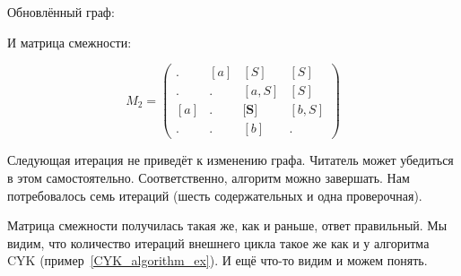 \begin{example}
Обновлённый граф:
\begin{center}
\end{center}
  

И матрица смежности:

$$ M_2 =
\begin{pmatrix} 
. & [a] & [S] & [S] \\
. & . & [a, S] & [S] \\
[a] & . & \textbf{[S]} & [b,S] \\
. & . & [b] & . 
\end{pmatrix}
$$


Следующая итерация не приведёт к изменению графа.
Читатель может убедиться в этом самостоятельно.
Соответственно, алгоритм можно завершать.
Нам потребовалось семь итераций (шесть содержательных и одна проверочная).

Матрица смежности получилась такая же, как и раньше, ответ правильный.
Мы видим, что количество итераций внешнего цикла такое же как и у алгоритма CYK (пример~\ref{CYK_algorithm_ex}).
И ещё что-то видим и можем понять.

\end{example}


